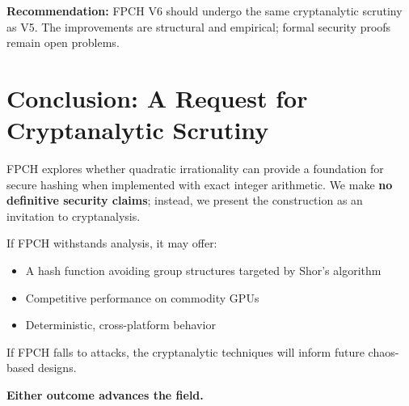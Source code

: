 \documentclass[11pt,a4paper]{article}
\theoremstyle{plain}
\theoremstyle{definition}
\theoremstyle{remark}
\begin{document}
\textbf{Recommendation:} FPCH V6 should undergo the same cryptanalytic scrutiny as V5. The improvements are structural and empirical; formal security proofs remain open problems.

\section{Conclusion: A Request for Cryptanalytic Scrutiny}

FPCH explores whether quadratic irrationality can provide a foundation for secure hashing when implemented with exact integer arithmetic. We make \textbf{no definitive security claims}; instead, we present the construction as an invitation to cryptanalysis.

If FPCH withstands analysis, it may offer:
\begin{itemize}
    \item A hash function avoiding group structures targeted by Shor's algorithm
    \item Competitive performance on commodity GPUs
    \item Deterministic, cross-platform behavior
\end{itemize}

If FPCH falls to attacks, the cryptanalytic techniques will inform future chaos-based designs.

\textbf{Either outcome advances the field.}
\end{document}

